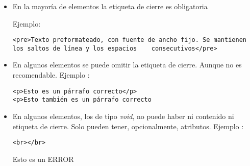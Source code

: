 \documentclass[ucs]{beamer}
\begin{document}
\begin{frame}[fragile]
\frametitle{}
\begin{itemize}
\item
En la mayoría de elementos la etiqueta de cierre es obligatoria 

Ejemplo:

  \begin{footnotesize}
  \begin{verbatim}
<pre>Texto preformateado, con fuente de ancho fijo. Se mantienen 
los saltos de línea y los espacios    consecutivos</pre>
  \end{verbatim}
  \end{footnotesize}
\item
En algunos elementos se puede omitir la etiqueta de cierre. Aunque no es recomendable. Ejemplo :


  \begin{footnotesize}
  \begin{verbatim}
<p>Esto es un párrafo correcto</p>
<p>Esto también es un párrafo correcto
  \end{verbatim}
  \end{footnotesize}


\item
En algunos elementos, los de tipo \emph{void}, no puede haber ni contenido ni etiqueta de cierre. Solo pueden tener, opcionalmente, atributos.
Ejemplo :


  \begin{footnotesize}
  \begin{verbatim}
<br></br>
  \end{verbatim}
  \end{footnotesize}
Esto es un ERROR

\end{itemize}

\end{frame}
\end{document}
